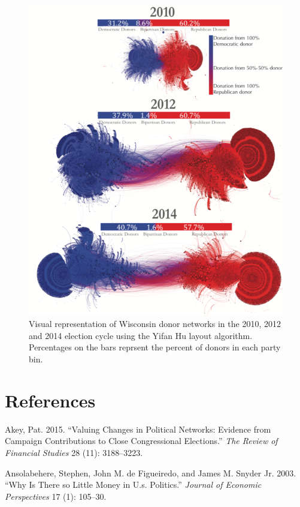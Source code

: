\documentclass[12pt,]{article}
\begin{document}
\begin{figure}
\centering
\includegraphics{../figures/fig1.png}
\caption{Visual representation of Wisconsin donor networks in the 2010,
2012 and 2014 election cycle using the Yifan Hu layout algorithm.
Percentages on the bars reprsent the percent of donors in each party
bin.}
\end{figure}

\hypertarget{references}{%
\section*{References}\label{references}}

\hypertarget{refs}{}
\leavevmode\hypertarget{ref-akey2015}{}%
Akey, Pat. 2015. ``Valuing Changes in Political Networks: Evidence from
Campaign Contributions to Close Congressional Elections.'' \emph{The
Review of Financial Studies} 28 (11): 3188--3223.

\leavevmode\hypertarget{ref-ansolabehere2003}{}%
Ansolabehere, Stephen, John M. de Figueiredo, and James M. Snyder Jr.
2003. ``Why Is There so Little Money in U.s. Politics.'' \emph{Journal
of Economic Perspectives} 17 (1): 105--30.
\end{document}
